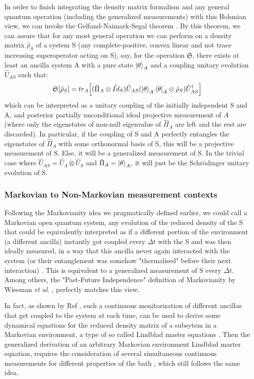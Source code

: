 \documentclass[11pt, a4paper]{article} %
\begin{document}
In order to finish integrating the density matrix formalism and any general quantum operation (including the generalized measurements) with this Bohmian view, we can invoke the Gelfand-Naimark-Segal theorem \cite{GNSTheorem, Generalized}. By this theorem, we can assure that for any most general operation we can perform on a density matrix $\hat{\rho}_S$ of a system S (any complete-positive, convex linear and not trace increasing superoperator acting on S), say, for the operation $\mathfrak{S}$, there exists at least an ancilla system A with a pure state $\ket{\theta}_A$ and a coupling unitary evolution $\hat{U}_{AS}$ such that:
\begin{equation}
\mathfrak{S}[\hat{\rho}_S]=tr_A\qty[ (\hat{\Pi}_A\otimes \hat{Id}_S)  \hat{U}_{AS}\qty(\ket{\theta}_A\bra{\theta}_A\otimes \hat{\rho}_S)\hat{U}_{AS}^\dagger]
\end{equation}
which can be interpreted as a unitary coupling of the initially independent S and A, and posterior partially unconditional ideal projective measurement of $A$ (where only the eigenstates of non-null eigenvalue of $\hat{\Pi}_A$ are left and the rest are discarded). In particular, if the coupling of S and A perfectly entangles the eigenstates of $\hat{\Pi}_A$ with some orthonormal basis of S, this will be a projective measurement of S. Else, it will be a generalized measurement of S. In the trivial case where $\hat{U}_{AS}=\hat{U}_A\otimes\hat{U}_S$ and $\hat{\Pi}_A=\ket{\theta}_A$, it will just be the Schrödinger unitary evolution of S.


\subsubsection*{Markovian to Non-Markovian measurement contexts}
Following the Markovianity idea we pragmatically defined earlier, we could call a Markovian open quantum system, any evolution of the reduced density of the S that could be equivalently interpreted as if a different portion of the environment (a different ancilla) instantly got coupled every $\Delta t$ with the S and was then ideally measured, in a way that this ancilla never again interacted with the system (or their entanglement was somehow "thermalised" before their next interaction) \cite{QuantumTrajs}. This is equivalent to a generalized measurement of S every $\Delta t$. Among others, the "Past-Future Independence" definition of Markovianity by Wiseman {\em et al.} \cite{MarkovianityDefs}, perfectly matches this view.

In fact, as shown by Ref \cite{continousMeas}, such a continuous monitorization of different ancillas that get coupled to the system at each time, can be used to derive some dynamical equations for the reduced density matrix of a subsytem in a Markovian environment, a type of so called Lindblad master equations \cite{Generalized, MarkovianityDefs}. Then the generalized derivation of an arbitrary Markovian environment Lindblad master equation, requires the consideration of several simultaneous continuous measurements for different properties of the bath \cite{continousMeas, MarkovianityDefs}, which still follows the same idea.
\end{document}
